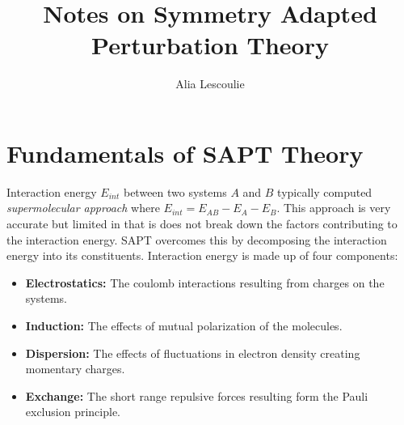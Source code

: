 \documentclass{article}[letterpaper, margins=1in, 12pt]
\title{Notes on Symmetry Adapted Perturbation Theory}
\author{Alia Lescoulie}
\begin{document}
\maketitle

\section{Fundamentals of SAPT Theory}

Interaction energy $E_{int}$ between two systems $A$ and $B$ typically computed \textit{supermolecular approach} where $E_{int} = E_{AB} - E_{A} -E_{B}$. This approach is very accurate but limited in that is does not break down the factors contributing to the interaction energy. SAPT overcomes this by decomposing the interaction energy into its constituents. Interaction energy is made up of four components:

\begin{itemize}
    \item \textbf{Electrostatics:} The coulomb interactions resulting from charges on the systems.
    \item \textbf{Induction:} The effects of mutual polarization of the molecules.
    \item \textbf{Dispersion:} The effects of fluctuations in electron density creating momentary charges.
    \item \textbf{Exchange:} The short range repulsive forces resulting form the Pauli exclusion principle.
\end{itemize}
\end{document}
